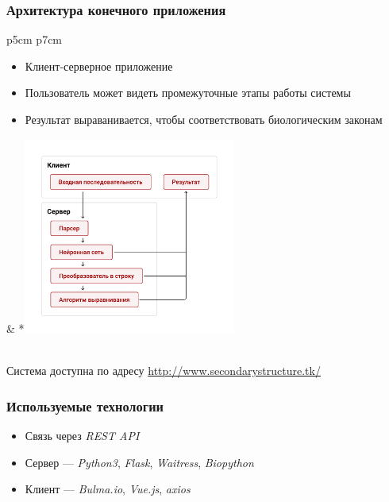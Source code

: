 \documentclass{beamer}
\begin{document}
\begin{frame}[fragile]
\transwipe[direction=90]
\frametitle{Архитектура конечного приложения}
\begin{tabular}{p{5cm} p{7cm}}
	\begin{itemize}
		\item Клиент-серверное приложение
		\item Пользователь может видеть промежуточные этапы работы системы
		\item Результат выраванивается, чтобы соответствовать биологическим законам
		
		
	\end{itemize} &
	*{\!\includegraphics[width=7cm]{pictures/diag1.pdf}}
\end{tabular} \\ \bigskip 
Система доступна по адресу \url{http://www.secondarystructure.tk/}

\end{frame}

\begin{frame}
\transwipe[direction=90]
\frametitle{Используемые технологии}
\begin{itemize}
	\item Связь через \textit{REST API}
	\item Сервер --- \textit{Python3}, \textit{Flask}, \textit{Waitress}, \textit{Biopython}
	\item Клиент --- \textit{Bulma.io}, \textit{Vue.js}, \textit{axios}
	
\end{itemize}\medskip

\end{frame}
	
\end{document}
